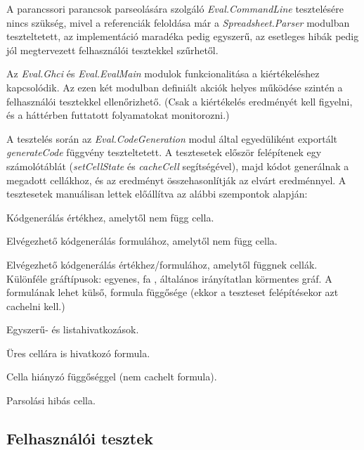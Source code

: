 A parancssori parancsok parseolására szolgáló \textit{Eval.CommandLine} tesztelésére nincs szükség, mivel a referenciák feloldása már a \textit{Spreadsheet.Parser} modulban teszteltetett, az implementáció maradéka pedig egyszerű, az esetleges hibák pedig jól megtervezett felhasználói tesztekkel szűrhetől.

Az \textit{Eval.Ghci} és \textit{Eval.EvalMain} modulok funkcionalitása a kiértékeléshez kapcsolódik. Az ezen két modulban definiált akciók helyes működése szintén a felhasználói tesztekkel ellenőrizhető. (Csak a kiértékelés eredményét kell figyelni, és a háttérben futtatott folyamatokat monitorozni.)

A tesztelés során az \textit{Eval.CodeGeneration} modul által egyedüliként exportált \textit{generateCode} függvény teszteltetett. A tesztesetek először felépítenek egy számolótáblát (\textit{setCellState} és \textit{cacheCell} segítségével), majd kódot generálnak a megadott cellákhoz, és az eredményt összehasonlítják az elvárt eredménnyel. A tesztesetek manuálisan lettek előállítva az alábbi szempontok alapján: 

\begin{compactenum}
	\item Kódgenerálás értékhez, amelytől nem függ cella.
	\item Elvégezhető kódgenerálás formulához, amelytől nem függ cella.
	\item Elvégezhető kódgenerálás értékhez/formulához, amelytől függnek cellák. Különféle gráftípusok: egyenes, fa	, általános irányítatlan körmentes gráf. A formulának lehet külső, formula függősége (ekkor a teszteset felépítésekor azt cachelni kell.)
	\item Egyszerű- és listahivatkozások.
	\item Üres cellára is hivatkozó formula.
	\item Cella hiányzó függőséggel (nem cachelt formula).
	\item Parsolási hibás cella.
\end{compactenum}

\subsection{Felhasználói tesztek}

